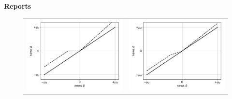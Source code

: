 \documentclass{article}
\begin{document}
\pagebreak
\begin{center}
	\textbf{Reports}
\end{center}
\begin{figure}[h]
	\begin{center}
		\begin{tabular}{cc}
			\includegraphics[scale=.5]{news_news_managers_report} & \includegraphics[scale=.5]{news_news_journalist_report} 
		\end{tabular}
	\end{center}
\end{figure}
\end{document}
